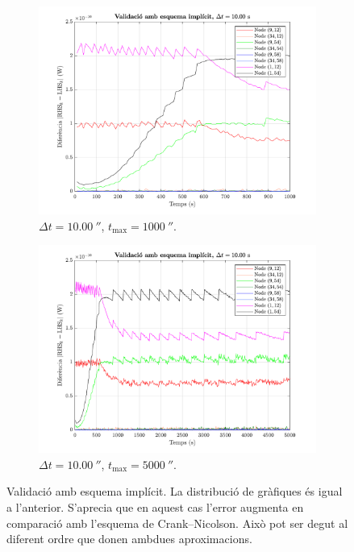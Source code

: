 \begin{figure}[ht]
\begin{subfigure}{.5\textwidth}
		\label{fig:validacio_10}
	\end{subfigure}
	\begin{subfigure}{.5\textwidth}
		\centering
		\includegraphics[width=.95\linewidth]{imagenes/03_validacio/validacio_11.pdf}
		\vspace{-7pt}
		\caption{$\Delta t = 10.00 \ \second$, $t_\text{max} = 1000 \ \second$.}
		\label{fig:validacio_11}
	\end{subfigure}%
	\begin{subfigure}{.5\textwidth}
		\centering
		\includegraphics[width=.95\linewidth]{imagenes/03_validacio/validacio_12.pdf}
		\vspace{-7pt}
		\caption{$\Delta t = 10.00 \ \second$, $t_\text{max} = 5000 \ \second$.}
		\label{fig:validacio_12}
	\end{subfigure}
	\caption{Validació amb esquema implícit. La distribució de gràfiques és igual a l'anterior. S'aprecia que en aquest cas l'error augmenta en comparació amb l'esquema de Crank--Nicolson. Això pot ser degut al diferent ordre que donen ambdues aproximacions.}
	\label{fig:validacio_implicit}
\end{figure}



